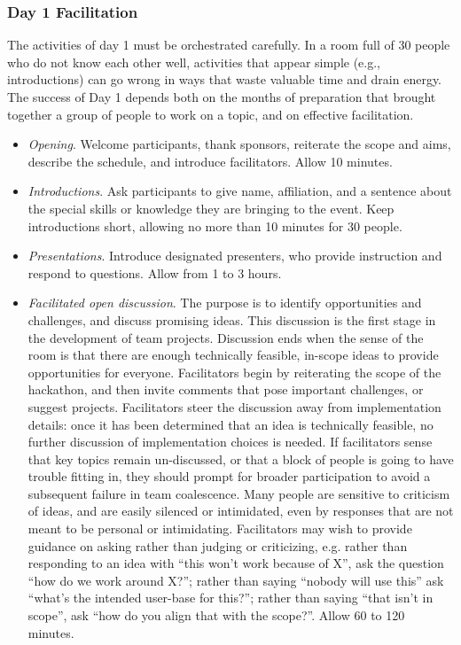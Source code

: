 \documentclass[11pt]{article}
\begin{document}
\subsubsection*{Day 1 Facilitation} The activities of day 1 must be orchestrated carefully. In a room full of 30 people who do not know each other well, activities that appear simple (e.g., introductions) can go wrong in ways that waste valuable time and drain energy. The success of Day 1 depends both on the months of preparation that brought together a group of people to work on a topic, and on effective facilitation. 
\begin{itemize}
\item	{\em Opening}. Welcome participants, thank sponsors, reiterate the scope and aims, describe the schedule, and introduce facilitators. Allow 10 minutes.
\item	{\em Introductions}. Ask participants to give name, affiliation, and a sentence about the special skills or knowledge they are bringing to the event. Keep introductions short, allowing no more than 10 minutes for 30 people. 
\item	{\em Presentations}. Introduce designated presenters, who provide instruction and respond to questions. Allow from 1 to 3 hours.  
\item	{\em Facilitated open discussion}. The purpose is to identify opportunities and challenges, and discuss promising ideas. This discussion is the first stage in the development of team projects. Discussion ends when the sense of the room is that there are enough technically feasible, in-scope ideas to provide opportunities for everyone. Facilitators begin by reiterating the scope of the hackathon, and then invite comments that pose important challenges, or suggest projects. Facilitators steer the discussion away from implementation details: once it has been determined that an idea is technically feasible, no further discussion of implementation choices is needed. If facilitators sense that key topics remain un-discussed, or that a block of people is going to have trouble fitting in, they should prompt for broader participation to avoid a subsequent failure in team coalescence. Many people are sensitive to criticism of ideas, and are easily silenced or intimidated, even by responses that are not meant to be personal or intimidating. Facilitators may wish to provide guidance on asking rather than judging or criticizing, e.g. rather than responding to an idea with “this won’t work because of X”, ask the question “how do we work around X?”; rather than saying “nobody will use this” ask “what’s the intended user-base for this?”; rather than saying “that isn’t in scope”, ask “how do you align that with the scope?”.  Allow 60 to 120 minutes.  

\end{itemize}
\end{document}
